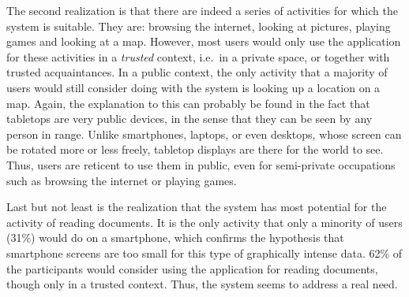 The second realization is that there are indeed a series of activities for which the system is suitable.
They are: browsing the internet, looking at pictures, playing games and looking at a map.
However, most users would only use the application for these activities in a \emph{trusted} context, i.e.\ in a private space, or together with trusted acquaintances.
In a public context, the only activity that a majority of users would still consider doing with the system is looking up a location on a map.
Again, the explanation to this can probably be found in the fact that tabletops are very public devices, in the sense that they can be seen by any person in range.
Unlike smartphones, laptops, or even desktops, whose screen can be rotated more or less freely, tabletop displays are there for the world to see.
Thus, users are reticent to use them in public, even for semi-private occupations such as browsing the internet or playing games.

Last but not least is the realization that the system has most potential for the activity of reading documents.
It is the only activity that only a minority of users (31\%) would do on a smartphone, which confirms the hypothesis that smartphone screens are too small for this type of graphically intense data.
62\% of the participants would consider using the application for reading documents, though only in a trusted context.
Thus, the system seems to address a real need.


















